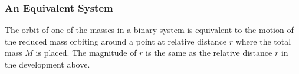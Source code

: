 \documentclass[12pt,compress,aspectratio=169]{beamer}
\newcommand{\mb}[1]{\ensuremath\mathbf{#1}}
\begin{document}
\begin{frame}
  \frametitle{An Equivalent System}
  The orbit of one of the masses in a binary system is equivalent to the motion
  of the reduced mass orbiting around a point at relative distance $r$ where
  the total mass $M$ is placed. The magnitude of $r$ is the same as the
  relative distance $r$ in the development above.
  \begin{center}
    \vspace{-.2in}
  \end{center}
\end{frame}
\end{document}
